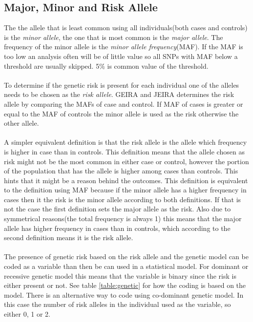 \documentclass[10pt,a4paper]{report}
\begin{document}
\subsection{Major, Minor and Risk Allele}
The the allele that is least common using all individuals(both cases and controls) is the \emph{minor allele}, the one that is most common is the \emph{major allele}. The frequency of the minor allele is the \emph{minor allele frequency}(MAF)\cite{uvehag_master_thesis, geira}. If the MAF is too low an analysis often will be of little value so all SNPs with MAF below a threshold are usually skipped. 5\% is common value of the threshold\cite{burton2007genome, geira}.\\
\\
To determine if the genetic risk is present for each individual one of the alleles needs to be chosen as the \emph{risk allele}. GEIRA and JEIRA determines the risk allele by comparing the MAFs of case and control\cite{geisa, uvehag_master_thesis}. If MAF of cases is greater or equal to the MAF of controls the minor allele is used as the risk otherwise the other allele\cite{geisa, uvehag_master_thesis}.\\
\\
A simpler equivalent definition is that the risk allele is the allele which frequency is higher in case than in controls. This definition means that the allele chosen as risk might not be the most common in either case or control, however the portion of the population that has the allele is higher among cases than controls. This hints that it might be a reason behind the outcomes. This definition is equivalent to the definition using MAF because if the minor allele has a higher frequency in cases then it the risk is the minor allele according to both definitions. If that is not the case the first definition sets the major allele as the risk. Also due to symmetrical reasons(the total frequency is always 1) this means that the major allele has higher frequency in cases than in controls, which according to the second definition means it is the risk allele.\\
\\
The presence of genetic risk based on the risk allele and the genetic model can be coded as a variable than then be can used in a statistical model. For dominant or recessive genetic model this means that the variable is binary since the risk is either present or not. See table \ref{table:genetic} for how the coding is based on the model. There is an alternative way to code using co-dominant genetic model. In this case the number of risk alleles in the individual used as the variable, so either 0, 1 or 2. %
\end{document}
